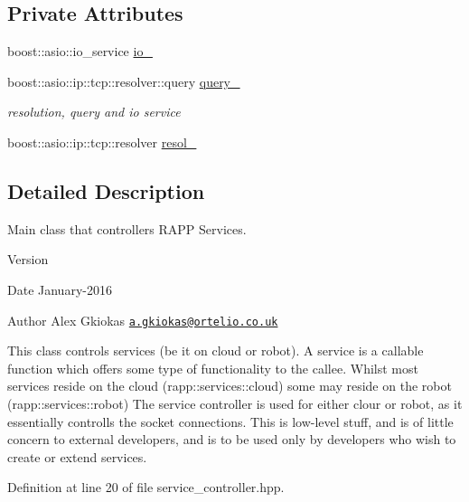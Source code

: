 \subsection*{Private Attributes}
\begin{DoxyCompactItemize}
\item 
boost\-::asio\-::io\-\_\-service \hyperlink{classrapp_1_1cloud_1_1service__controller_ae75747e5cb7ec35db7413b6a5d8c560d}{io\-\_\-}
\item 
boost\-::asio\-::ip\-::tcp\-::resolver\-::query \hyperlink{classrapp_1_1cloud_1_1service__controller_a9f8f7b72c7ca33968f3a549cc1b78458}{query\-\_\-}
\begin{DoxyCompactList}\small\item\em resolution, query and io service \end{DoxyCompactList}\item 
boost\-::asio\-::ip\-::tcp\-::resolver \hyperlink{classrapp_1_1cloud_1_1service__controller_ae26bae9aaefaf7ddbd104fd1772afdd3}{resol\-\_\-}
\end{DoxyCompactItemize}


\subsection{Detailed Description}
Main class that controllers R\-A\-P\-P Services. 

\begin{DoxyVersion}{Version}

\end{DoxyVersion}
\begin{DoxyDate}{Date}
January-\/2016 
\end{DoxyDate}
\begin{DoxyAuthor}{Author}
Alex Gkiokas \href{mailto:a.gkiokas@ortelio.co.uk}{\tt a.\-gkiokas@ortelio.\-co.\-uk}
\end{DoxyAuthor}
This class controls services (be it on cloud or robot). A service is a callable function which offers some type of functionality to the callee. Whilst most services reside on the cloud (rapp\-::services\-::cloud) some may reside on the robot (rapp\-::services\-::robot) The service controller is used for either clour or robot, as it essentially controlls the socket connections. This is low-\/level stuff, and is of little concern to external developers, and is to be used only by developers who wish to create or extend services. 

Definition at line 20 of file service\-\_\-controller.\-hpp.



